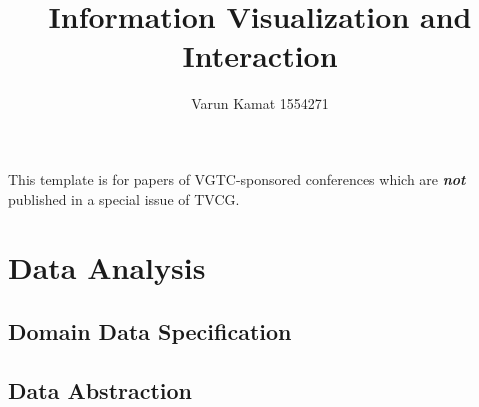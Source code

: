 \documentclass[review]{vgtc}                 %
\title{Information Visualization and Interaction}
\author{Varun Kamat 1554271 }
\begin{document}


\maketitle

This template is for papers of VGTC-sponsored conferences which are \emph{\textbf{not}} published in a special issue of TVCG.

\section{Data Analysis}
\subsection{Domain Data Specification}
\subsection{Data Abstraction}
\end{document}
